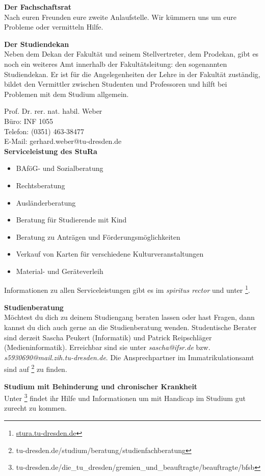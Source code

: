 
\textbf{Der Fachschaftsrat} \\
Nach euren Freunden eure zweite Anlaufstelle.
Wir kümmern uns um eure Probleme oder vermitteln Hilfe.

\textbf{Der Studiendekan} \\
Neben dem Dekan der Fakultät und seinem Stellvertreter, dem Prodekan, gibt es noch ein weiteres Amt innerhalb der Fakultätsleitung:
den sogenannten Studiendekan.
Er ist für die Angelegenheiten der Lehre in der Fakultät zuständig, bildet den Vermittler zwischen Studenten und Professoren und hilft bei Problemen mit dem Studium allgemein.

Prof. Dr. rer. nat. habil. Weber \\
Büro: INF 1055 \\
Telefon: (0351) 463-38477 \\
E-Mail: gerhard.weber@tu-dresden.de \\

\textbf{Serviceleistung des StuRa} \\
\begin{itemize}
\item BAföG- und Sozialberatung
\item Rechtsberatung
\item Ausländerberatung
\item Beratung für Studierende mit Kind
\item Beratung zu Anträgen und Förderungsmöglichkeiten
\item Verkauf von Karten für verschiedene Kulturveranstaltungen
\item Material- und Geräteverleih
\end{itemize}

Informationen zu allen Serviceleistungen gibt es im \textit{spiritus rector} und unter \footnote{\url{stura.tu-dresden.de}}.

\textbf{Studienberatung} \\
Möchtest du dich zu deinem Studiengang beraten lassen oder hast Fragen, dann kannst du dich auch gerne an die Studienberatung wenden.
Studentische Berater sind derzeit Sascha Peukert (Informatik) und Patrick Reipschläger (Medieninformatik).
Erreichbar sind sie unter \textit{sascha@ifsr.de} bzw. \textit{s5930690@mail.zih.tu-dresden.de}.
Die Ansprechpartner im Immatrikulationsamt sind auf \footnote{tu-dresden.de/studium/beratung/studienfachberatung} zu finden.

\textbf{Studium mit Behinderung und chronischer Krankheit} \\
Unter \footnote{tu-dresden.de/die\_tu\_dresden/gremien\_und\_beauftragte/beauftragte/bfsb} findet ihr Hilfe und Informationen um mit Handicap im Studium gut zurecht zu kommen.

